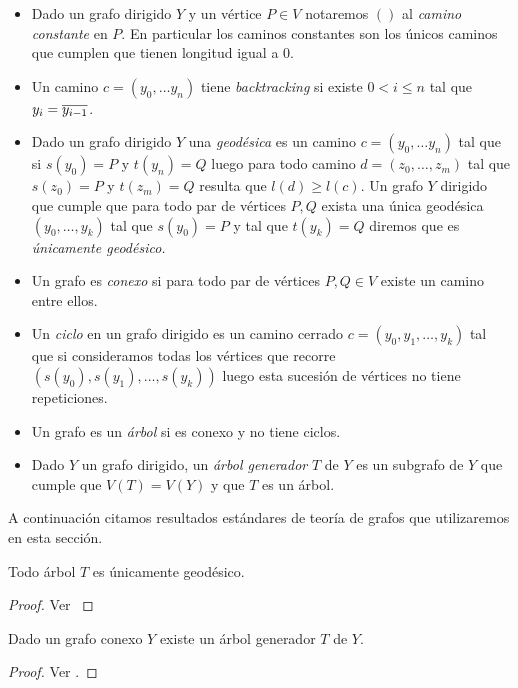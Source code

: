 \documentclass[tesis.tex]{subfiles}
\begin{document}
\begin{deff}
\begin{itemize}
		\item Dado un grafo dirigido $Y$ y un vértice $P \in V$ notaremos $()$ al \emph{camino constante} en $P$. 
		En particular los caminos constantes son los únicos caminos que cumplen que tienen longitud igual a $0$.

		\item Un camino $c= (y_0, \dots y_n)$ tiene \emph{backtracking} si existe $ 0 < i \le n$ tal que $y_i = \overline{y_{i-1}}$.		
		
		\item Dado un grafo dirigido $Y$ una \emph{geodésica} es un camino $c = (y_0, \dots y_n)$ tal que si $s(y_0)=P$ y $t(y_n)=Q$ luego para todo camino $d = (z_0, \dots, z_m)$ tal que $s(z_0) = P$ y $t(z_m) = Q$ resulta que $l(d) \ge l(c)$.
		Un grafo $Y$ dirigido que cumple que para todo par de vértices $P,Q$ exista una única geodésica $(y_0, \dots, y_k)$ tal que $s(y_0) = P$ y tal que $t(y_k) = Q$ diremos que es \emph{únicamente geodésico.}
		
		\item 	Un grafo es \emph{conexo} si para todo par de vértices $P, Q \in V$ existe un camino entre ellos.
		
		
		\item Un \emph{ciclo} en un grafo dirigido es un camino cerrado $c = (y_0, y_1, \dots, y_k)$ tal que si consideramos todas los vértices que recorre $(s(y_0),s(y_{1}), \dots, s(y_{k}))$ luego esta sucesión de vértices no tiene repeticiones.
		
				
		\item Un grafo es un \emph{árbol} si es conexo y no tiene ciclos.
		
		\item Dado $Y$ un grafo dirigido, un \emph{árbol generador} $T$ de $Y$ es un subgrafo de $Y$ que cumple que $V(T) = V(Y)$ y que $T$ es un árbol.
	\end{itemize}
\end{deff}	

A continuación citamos resultados estándares de teoría de grafos que utilizaremos en esta sección.
	
\begin{lema}
	Todo árbol $T$ es únicamente geodésico.
\end{lema}
\begin{proof}
	Ver \cite{diestel2005graph}
\end{proof}

\begin{prop}
	Dado un grafo conexo $Y$ existe un árbol generador $T$ de $Y$.
\end{prop}
\begin{proof}
	Ver \cite{diestel2005graph}.
\end{proof}
\end{document}
